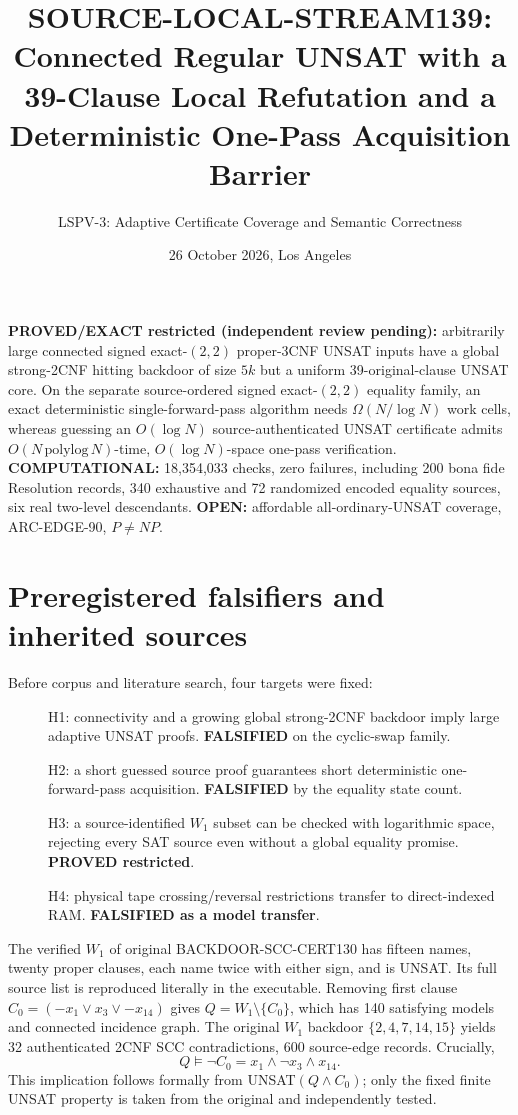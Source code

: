 \documentclass[11pt]{article}
\title{SOURCE-LOCAL-STREAM139: Connected Regular UNSAT with a 39-Clause Local Refutation and a Deterministic One-Pass Acquisition Barrier}
\author{LSPV-3: Adaptive Certificate Coverage and Semantic Correctness}
\date{26 October 2026, Los Angeles}
\begin{document}
\maketitle
\begin{center}
\textbf{PROVED/EXACT restricted (independent review pending):}
arbitrarily large connected signed exact-$(2,2)$ proper-3CNF UNSAT inputs
have a global strong-2CNF hitting backdoor of size $5k$ but a uniform
39-original-clause UNSAT core.  On the separate source-ordered signed exact-$(2,2)$ equality family,
an exact deterministic single-forward-pass algorithm needs
$\Omega(N/\log N)$ work cells, whereas guessing an $O(\log N)$ source-authenticated
UNSAT certificate admits $O(N\,\mathrm{polylog}\,N)$-time,
$O(\log N)$-space one-pass verification.\\
\textbf{COMPUTATIONAL:} 18,354,033 checks, zero failures, including
200 bona fide Resolution records, 340 exhaustive and 72 randomized
encoded equality sources, six real two-level descendants.
\textbf{OPEN:} affordable all-ordinary-UNSAT coverage, ARC-EDGE-90, $P\ne NP$.
\end{center}
\section{Preregistered falsifiers and inherited sources}
Before corpus and literature search, four targets were fixed:
\begin{description}
\item[] H1: connectivity and a growing global strong-2CNF backdoor imply
large adaptive UNSAT proofs. \textbf{FALSIFIED} on the cyclic-swap family.
\item[] H2: a short guessed source proof guarantees short deterministic
one-forward-pass acquisition. \textbf{FALSIFIED} by the equality state count.
\item[] H3: a source-identified $W_1$ subset can be checked with logarithmic
space, rejecting every SAT source even without a global equality promise.
\textbf{PROVED restricted}.
\item[] H4: physical tape crossing/reversal restrictions transfer to
direct-indexed RAM. \textbf{FALSIFIED as a model transfer}.
\end{description}
The verified $W_1$ of original BACKDOOR-SCC-CERT130 has fifteen names,
twenty proper clauses, each name twice with either sign, and is UNSAT.
Its full source list is reproduced literally in the executable.
Removing first clause $C_0=(-x_1\lor x_3\lor -x_{14})$ gives
$Q=W_1\setminus\{C_0\}$, which has 140 satisfying models and connected
incidence graph. The original $W_1$ backdoor
$\{2,4,7,14,15\}$ yields 32 authenticated 2CNF SCC contradictions,
600 source-edge records. Crucially,
\[
 Q\models \neg C_0=x_1\land\neg x_3\land x_{14}. \tag{1}
\]
This implication follows formally from UNSAT$(Q\land C_0)$; only the
fixed finite UNSAT property is taken from the original and independently tested.
\end{document}
